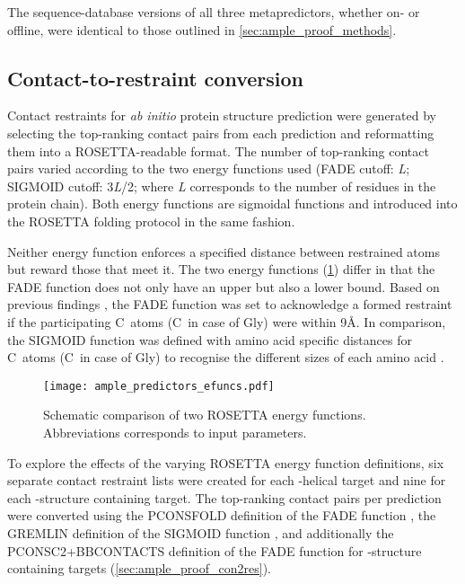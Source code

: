 The sequence-database versions of all three metapredictors, whether on- or offline, were identical to those outlined in \cref{sec:ample_proof_methods}.

\subsection{Contact-to-restraint conversion} \label{subsec:ample_predictors_con2res}
Contact restraints for \textit{ab initio} protein structure prediction were generated by selecting the top-ranking contact pairs from each prediction and reformatting them into a ROSETTA-readable format. The number of top-ranking contact pairs varied according to the two energy functions used (FADE cutoff: \textit{L}; SIGMOID cutoff: 3\textit{L}/2; where \textit{L} corresponds to the number of residues in the protein chain). Both energy functions are sigmoidal functions and introduced into the ROSETTA folding protocol in the same fashion. 

Neither energy function enforces a specified distance between restrained atoms but reward those that meet it. The two energy functions (\cref{fig:ample_predictors_efuncs}) differ in that the FADE function does not only have an upper but also a lower bound. Based on previous findings \cite{Michel2014-eg,Skwark2014-qp}, the FADE function was set to acknowledge a formed restraint if the participating C\textbeta\ atoms (C\textalpha\ in case of Gly) were within 9\AA. In comparison, the SIGMOID function was defined with amino acid specific distances for C\textbeta\ atoms (C\textalpha\ in case of Gly) to recognise the different sizes of each amino acid \cite{Kamisetty2013-le,Ovchinnikov2015-tn}.

\begin{figure}[H]
    \centering
    \texttt{[image: ample\_predictors\_efuncs.pdf]}
    \caption[Schematic comparison of ROSETTA energy functions]{Schematic comparison of two ROSETTA energy functions. Abbreviations corresponds to input parameters.}
    \label{fig:ample_predictors_efuncs}
\end{figure}

To explore the effects of the varying ROSETTA energy function definitions, six separate contact restraint lists were created for each \textalpha-helical target and nine for each \textbeta-structure containing target. The top-ranking contact pairs per prediction were converted using the PCONSFOLD definition of the FADE function \cite{Michel2014-eg}, the GREMLIN definition of the SIGMOID function \cite{Ovchinnikov2015-tn}, and additionally the PCONSC2+BBCONTACTS definition of the FADE function for \textbeta-structure containing targets (\cref{sec:ample_proof_con2res}).

